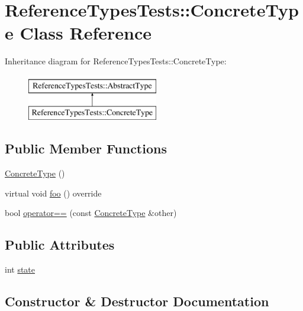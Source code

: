 \hypertarget{classReferenceTypesTests_1_1ConcreteType}{}\section{Reference\+Types\+Tests\+::Concrete\+Type Class Reference}
\label{classReferenceTypesTests_1_1ConcreteType}
Inheritance diagram for Reference\+Types\+Tests\+::Concrete\+Type\+:\begin{figure}[H]
\begin{center}
\leavevmode
\includegraphics[height=2.000000cm]{classReferenceTypesTests_1_1ConcreteType}
\end{center}
\end{figure}
\subsection*{Public Member Functions}
\begin{DoxyCompactItemize}
\item 
\mbox{\hyperlink{classReferenceTypesTests_1_1ConcreteType_a336e50f8ef3d1131a03a739addce9f5a}{Concrete\+Type}} ()
\item 
virtual void \mbox{\hyperlink{classReferenceTypesTests_1_1ConcreteType_aca90c05903e4ab0c480ae84c1ca75c2e}{foo}} () override
\item 
bool \mbox{\hyperlink{classReferenceTypesTests_1_1ConcreteType_ae575c7e4ffbc844f36cfa475bf1c8f1e}{operator==}} (const \mbox{\hyperlink{classReferenceTypesTests_1_1ConcreteType}{Concrete\+Type}} \&other)
\end{DoxyCompactItemize}
\subsection*{Public Attributes}
\begin{DoxyCompactItemize}
\item 
int \mbox{\hyperlink{classReferenceTypesTests_1_1ConcreteType_a6c8b60deef594b3428cf1f0efaeacf7e}{state}}
\end{DoxyCompactItemize}


\subsection{Constructor \& Destructor Documentation}
\mbox{\label{classReferenceTypesTests_1_1ConcreteType_a336e50f8ef3d1131a03a739addce9f5a}} 
